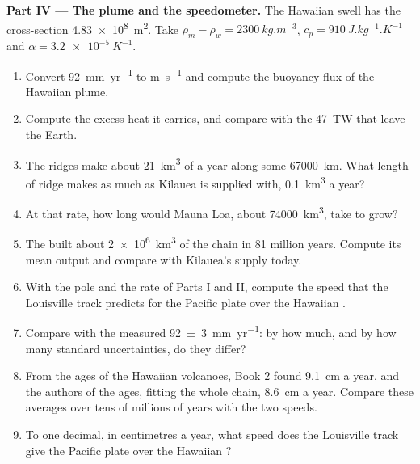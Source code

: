 \begin{problem}
\medskip
\noindent\textbf{Part IV --- The plume and the speedometer.} The Hawaiian swell
has the cross-section \qty{4.83e8}{m^2}. Take
$\rho_m - \rho_w = \qty{2300}{kg.m^{-3}}$, $c_p = \qty{910}{J.kg^{-1}.K^{-1}}$
and $\alpha = \qty{3.2e-5}{K^{-1}}$.
\begin{enumerate}[resume]
  \item Convert \qty{92}{mm.yr^{-1}} to \unit{m.s^{-1}} and compute the
        buoyancy flux of the Hawaiian plume.
  \item Compute the excess heat it carries, and compare with the \qty{47}{TW}
        that leave the Earth.
  \item The ridges make about \qty{21}{km^3} of  a year along some
        \qty{67000}{km}. What length of ridge makes as much  as Kilauea
        is supplied with, \qty{0.1}{km^3} a year?
  \item At that rate, how long would Mauna Loa, about \qty{74000}{km^3},
        take to grow?
  \item The  built about \qty{2e6}{km^3} of the chain in 81 million
        years. Compute its mean output and compare with Kilauea's supply today.
  \item With the pole and the rate of Parts I and II, compute the speed that
        the Louisville track predicts for the Pacific plate over the Hawaiian
        .
  \item Compare with the measured \qty[uncertainty-mode=separate]{92 \pm 3}{mm.yr^{-1}}: by how much, and
        by how many standard uncertainties, do they differ?
  \item From the ages of the Hawaiian volcanoes, Book 2 found \qty{9.1}{cm} a
        year, and the authors of the ages, fitting the whole chain,
        \qty{8.6}{cm} a year. Compare these averages over tens of millions of
        years with the two  speeds.
  \item To one decimal, in centimetres a year, what speed does the Louisville
        track give the Pacific plate over the Hawaiian ?
\end{enumerate}
\end{problem}
